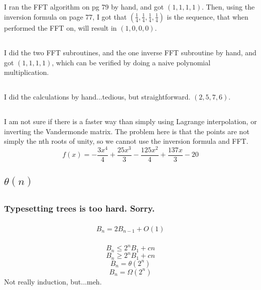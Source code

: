 \documentclass{article}
\begin{document}
\subsection{}I ran the FFT algorithm on pg 79 by hand, and got $(1,1,1,1)$. Then, using the inversion formula on page 77, I got that $(\frac{1}{4}, \frac{1}{4}, \frac{1}{4}, \frac{1}{4})$ is the sequence, that when performed the FFT on, will result in $(1,0,0,0)$.
\subsection{}
\subsubsection{}I did the two FFT subroutines, and the one inverse FFT subroutine by hand, and got $(1,1,1,1)$, which can be verified by doing a naive polynomial multiplication.
\subsection{}I did the calculations by hand...tedious, but straightforward. $(2,5,7,6)$.
\subsection{}I am not sure if there is a faster way than simply using Lagrange interpolation, or inverting the Vandermonde matrix. The problem here is that the points are not simply the nth roots of unity, so we cannot use the inversion formula and FFT. 
$$ f(x) = -\frac{3 x^4}{4}+\frac{25 x^3}{3}-\frac{125 x^2}{4}+\frac{137 x}{3}-20 $$
\subsection{$\theta(n)$}
\subsection{}
\subsubsection{Typesetting trees is too hard. Sorry.}
\subsubsection{}
$$B_n=2B_{n-1}+O(1)$$
\subsubsection{}
$$B_n \leq 2^nB_1+cn$$
$$B_n \geq 2^nB_1+cn$$
$$B_n=\theta(2^n)$$
$$B_n=\Omega(2^n)$$
Not really induction, but...meh.
\end{document}

